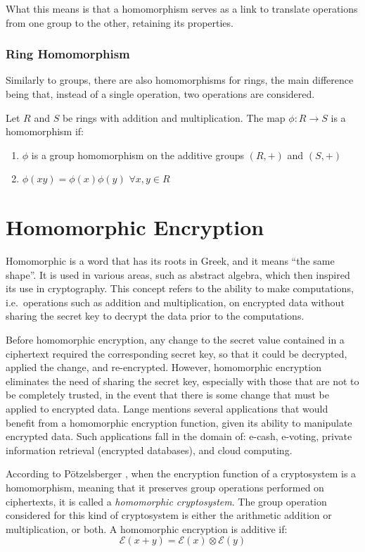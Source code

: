 What this means is that a homomorphism serves as a link to translate operations from one group to the other, retaining its properties.

\subsubsection{Ring Homomorphism}

Similarly to groups, there are also homomorphisms for rings, the main difference being that, instead of a single operation, two operations are considered.

Let $R$ and $S$ be rings with addition and multiplication. The map $\phi: R \rightarrow S$ is a homomorphism if:
\begin{enumerate}
\item $\phi$ is a group homomorphism on the additive groups $(R, +)$ and $(S,+)$
\item $\phi(xy) = \phi(x) \phi(y)$ $\forall x, y \in R$
\end{enumerate}

\section{Homomorphic Encryption}

Homomorphic is a word that has its roots in Greek, and it means ``the same shape''. It is used in various areas, such as abstract algebra, which then inspired its use in cryptography. This concept refers to the ability to make computations, i.e.\ operations such as addition and multiplication, on encrypted data without sharing the secret key to decrypt the data prior to the computations. 

Before homomorphic encryption, any change to the secret value contained in a ciphertext required the corresponding secret key, so that it could be decrypted, applied the change, and re-encrypted. However, homomorphic encryption eliminates the need of sharing the secret key, especially with those that are not to be completely trusted, in the event that there is some change that must be applied to encrypted data. 
Lange \cite{lange2011} mentions several applications that would benefit from a homomorphic encryption function, given its ability to manipulate encrypted data. Such applications fall in the domain of: e-cash, e-voting, private information retrieval (encrypted databases), and cloud computing.

According to P{\"o}tzelsberger \cite{potzelsberger2013kv}, when the encryption function of a cryptosystem is a homomorphism, meaning that it preserves group operations performed on ciphertexts, it is called a \emph{homomorphic cryptosystem}. The group operation considered for this kind of cryptosystem is either the arithmetic addition or multiplication, or both. A homomorphic encryption is additive if:
\begin{equation}
\mathcal{E}(x+y) = \mathcal{E}(x)\otimes \mathcal{E}(y)
\end{equation}

